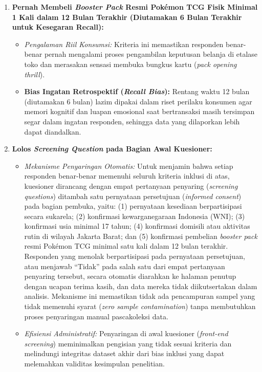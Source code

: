 \documentclass[12pt,a4paper]{article}
\numberwithin{equation}{section}
\numberwithin{table}{section}
\numberwithin{figure}{section}
\begin{document}
\begin{enumerate}
\begin{itemize}
    \item \emph{Diskresi Keuangan Mandiri:} Pada usia 17 tahun ke atas (umumnya berada pada jenjang pendidikan akhir SMA atau mahasiswa perguruan tinggi), individu telah memiliki alokasi diskresi keuangan pribadi (uang saku mandiri atau penghasilan kerja paruh waktu) yang dapat dibelanjakan secara independen di gerai kasir minimarket.
    \item \emph{Kapasitas Kognitif:} Memastikan kematangan kognitif responden dalam memahami butir-butir pernyataan kuesioner ilmiah secara objektif dan bertanggung jawab.
  \end{itemize}
  \item \textbf{Pernah Membeli \emph{Booster Pack} Resmi Pok\'emon TCG Fisik Minimal 1 Kali dalam 12 Bulan Terakhir (Diutamakan 6 Bulan Terakhir untuk Kesegaran Recall):}
  \begin{itemize}
    \item \emph{Pengalaman Riil Konsumsi:} Kriteria ini memastikan responden benar-benar pernah mengalami proses pengambilan keputusan belanja di etalase toko dan merasakan sensasi membuka bungkus kartu (\emph{pack opening thrill}).
    \item \textbf{Bias Ingatan Retrospektif (\emph{Recall Bias}):} Rentang waktu 12 bulan (diutamakan 6 bulan) lazim dipakai dalam riset perilaku konsumen agar memori kognitif dan luapan emosional saat bertransaksi masih tersimpan segar dalam ingatan responden, sehingga data yang dilaporkan lebih dapat diandalkan.
  \end{itemize}
  \item \textbf{Lolos \emph{Screening Question} pada Bagian Awal Kuesioner:}
  \begin{itemize}
    \item \emph{Mekanisme Penyaringan Otomatis:} Untuk menjamin bahwa setiap responden benar-benar memenuhi seluruh kriteria inklusi di atas, kuesioner dirancang dengan empat pertanyaan penyaring (\emph{screening questions}) ditambah satu pernyataan persetujuan (\emph{informed consent}) pada bagian pembuka, yaitu: (1) pernyataan kesediaan berpartisipasi secara sukarela; (2) konfirmasi kewarganegaraan Indonesia (WNI); (3) konfirmasi usia minimal 17 tahun; (4) konfirmasi domisili atau aktivitas rutin di wilayah Jakarta Barat; dan (5) konfirmasi pembelian \emph{booster pack} resmi Pok\'emon TCG minimal satu kali dalam 12 bulan terakhir. Responden yang menolak berpartisipasi pada pernyataan persetujuan, atau menjawab ``Tidak'' pada salah satu dari empat pertanyaan penyaring tersebut, secara otomatis diarahkan ke halaman penutup dengan ucapan terima kasih, dan data mereka tidak diikutsertakan dalam analisis. Mekanisme ini memastikan tidak ada pencampuran sampel yang tidak memenuhi syarat (\emph{zero sample contamination}) tanpa membutuhkan proses penyaringan manual pascakoleksi data.
    \item \emph{Efisiensi Administratif:} Penyaringan di awal kuesioner (\emph{front-end screening}) meminimalkan pengisian yang tidak sesuai kriteria dan melindungi integritas dataset akhir dari bias inklusi yang dapat melemahkan validitas kesimpulan penelitian.
  \end{itemize}
\end{enumerate}
\end{document}
